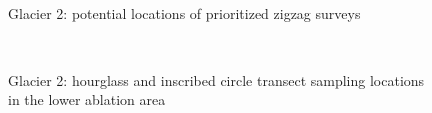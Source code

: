 \documentclass{sfuthesis}
\begin{document}
{\begin{appendices}
	\begin{figure}[H]
	\centering
	\\
\caption[]{Glacier 2: potential locations of prioritized zigzag surveys}
\end{figure}
	\begin{figure}[H]
	\centering
	\\
\caption[]{Glacier 2: hourglass and inscribed circle transect sampling locations in the lower ablation area}
\end{figure}
	\begin{figure}[H]
	\centering

\end{figure}
\end{appendices}}
\end{document}
